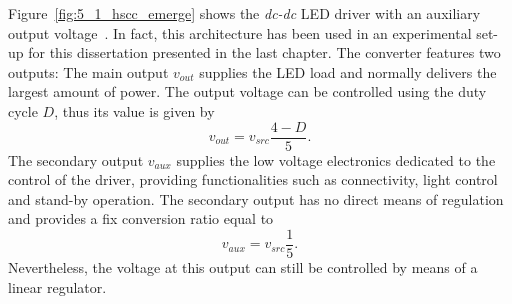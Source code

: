 Figure~\ref{fig:5_1_hscc_emerge} shows the \emph{dc-dc} LED driver with an auxiliary output voltage~\cite{WO2015/040564}.
In fact, this architecture has been used in an experimental set-up for this dissertation presented in the last chapter. The converter features two outputs: The main output $v_{out}$ supplies the LED load and normally delivers the largest amount of power. The output voltage can be controlled using the duty cycle $D$, thus its value is given by
\begin{equation}
v_{out} =  v_{src}  \frac{4 - D }{5}.
\label{eq:dc_dc_vout}
\end{equation}
The secondary output $v_{aux}$ supplies the low voltage electronics dedicated to the control of the driver, providing functionalities such as connectivity, light control and stand-by operation. The secondary output has no direct means of regulation and provides a fix conversion ratio equal to
\begin{equation}
v_{aux} =  v_{src} \frac{1 }{5}.
\label{eq:dc_dc_vaux}
\end{equation}
Nevertheless, the voltage at this output can still be controlled by means of a linear regulator.
